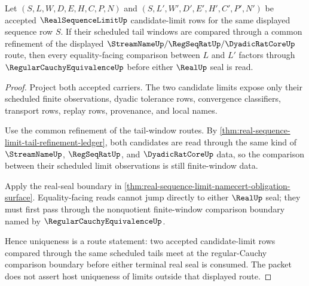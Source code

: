 \begin{theorem}\label{thm:real-sequence-limit-limit-uniqueness-route}
Let $(S,L,W,D,E,H,C,P,N)$ and $(S,L',W',D',E',H',C',P',N')$ be accepted $\RealSequenceLimitUp$ candidate-limit rows for the same displayed sequence row $S$. If their scheduled tail windows are compared through a common refinement of the displayed $\StreamNameUp/\RegSeqRatUp/\DyadicRatCoreUp$ route, then every equality-facing comparison between $L$ and $L'$ factors through $\RegularCauchyEquivalenceUp$ before either $\RealUp$ seal is read.
\end{theorem}
\begin{proof}
Project both accepted carriers. The two candidate limits expose only their scheduled finite observations, dyadic tolerance rows, convergence classifiers, transport rows, replay rows, provenance, and local names.

Use the common refinement of the tail-window routes. By \autoref{thm:real-sequence-limit-tail-refinement-ledger}, both candidates are read through the same kind of $\StreamNameUp$, $\RegSeqRatUp$, and $\DyadicRatCoreUp$ data, so the comparison between their scheduled limit observations is still finite-window data.

Apply the real-seal boundary in \autoref{thm:real-sequence-limit-namecert-obligation-surface}. Equality-facing reads cannot jump directly to either $\RealUp$ seal; they must first pass through the nonquotient finite-window comparison boundary named by $\RegularCauchyEquivalenceUp$.

Hence uniqueness is a route statement: two accepted candidate-limit rows compared through the same scheduled tails meet at the regular-Cauchy comparison boundary before either terminal real seal is consumed. The packet does not assert host uniqueness of limits outside that displayed route.
\end{proof}

